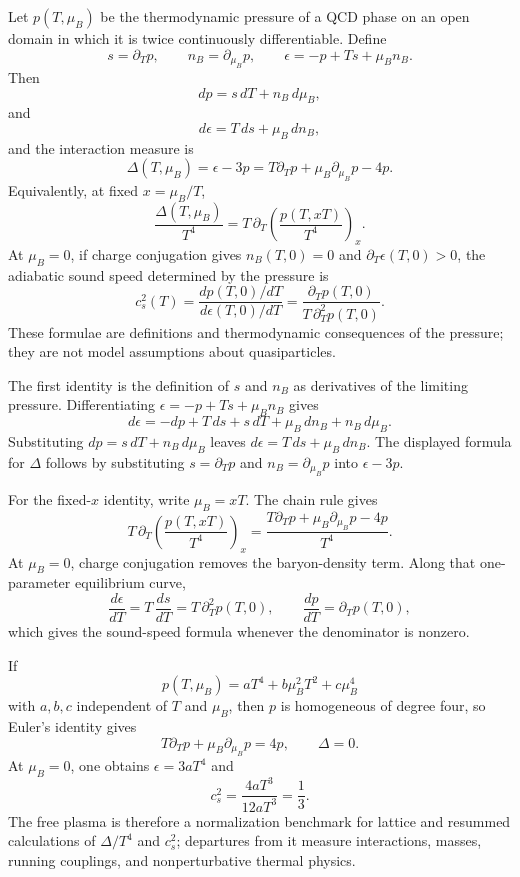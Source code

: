 \begin{remark}
\label{rem:qcd-thermodynamic-derivative-identities}
Let \(p(T,\mu_B)\) be the thermodynamic pressure of a QCD phase on an open
domain in which it is twice continuously differentiable.  Define
\[
  s=\partial_Tp,\qquad n_B=\partial_{\mu_B}p,\qquad
  \epsilon=-p+Ts+\mu_Bn_B .
\]
Then
\[
  dp=s\,dT+n_B\,d\mu_B,
\]
and
\[
  d\epsilon=T\,ds+\mu_B\,dn_B,
\]
and the interaction measure is
\[
  \Delta(T,\mu_B)=\epsilon-3p
  =
  T\partial_Tp+\mu_B\partial_{\mu_B}p-4p .
\]
Equivalently, at fixed \(x=\mu_B/T\),
\[
  \frac{\Delta(T,\mu_B)}{T^4}
  =
  T\,\partial_T\left(\frac{p(T,xT)}{T^4}\right)_{x}.
\]
At \(\mu_B=0\), if charge conjugation gives \(n_B(T,0)=0\) and
\(\partial_T\epsilon(T,0)>0\), the adiabatic sound speed determined by the
pressure is
\[
  c_s^2(T)
  =
  \frac{dp(T,0)/dT}{d\epsilon(T,0)/dT}
  =
  \frac{\partial_Tp(T,0)}{T\,\partial_T^2p(T,0)} .
\]
These formulae are definitions and thermodynamic consequences of the
pressure; they are not model assumptions about quasiparticles.

The first identity is the definition of \(s\) and \(n_B\) as derivatives of
the limiting pressure.  Differentiating
\(\epsilon=-p+Ts+\mu_Bn_B\) gives
\[
  d\epsilon
  =
  -dp+T\,ds+s\,dT+\mu_B\,dn_B+n_B\,d\mu_B.
\]
Substituting \(dp=s\,dT+n_B\,d\mu_B\) leaves
\(d\epsilon=T\,ds+\mu_B\,dn_B\).  The displayed formula for \(\Delta\)
follows by substituting \(s=\partial_Tp\) and
\(n_B=\partial_{\mu_B}p\) into \(\epsilon-3p\).

For the fixed-\(x\) identity, write \(\mu_B=xT\).  The chain rule gives
\[
  T\,\partial_T\left(\frac{p(T,xT)}{T^4}\right)_{x}
  =
  \frac{T\partial_Tp+\mu_B\partial_{\mu_B}p-4p}{T^4}.
\]
At \(\mu_B=0\), charge conjugation removes the baryon-density term.  Along
that one-parameter equilibrium curve,
\[
  \frac{d\epsilon}{dT}
  =
  T\,\frac{ds}{dT}
  =
  T\,\partial_T^2p(T,0),
  \qquad
  \frac{dp}{dT}=\partial_Tp(T,0),
\]
which gives the sound-speed formula whenever the denominator is nonzero.
\end{remark}

\begin{example}
\label{ex:qcd-conformal-sb-thermodynamics}
If
\[
  p(T,\mu_B)=aT^4+b\mu_B^2T^2+c\mu_B^4
\]
with \(a,b,c\) independent of \(T\) and \(\mu_B\), then \(p\) is homogeneous
of degree four, so Euler's identity gives
\[
  T\partial_Tp+\mu_B\partial_{\mu_B}p=4p,\qquad \Delta=0.
\]
At \(\mu_B=0\), one obtains \(\epsilon=3aT^4\) and
\[
  c_s^2=\frac{4aT^3}{12aT^3}=\frac13 .
\]
The free plasma is therefore a normalization benchmark for lattice and
resummed calculations of \(\Delta/T^4\) and \(c_s^2\); departures from it
measure interactions, masses, running couplings, and nonperturbative thermal
physics.
\end{example}

